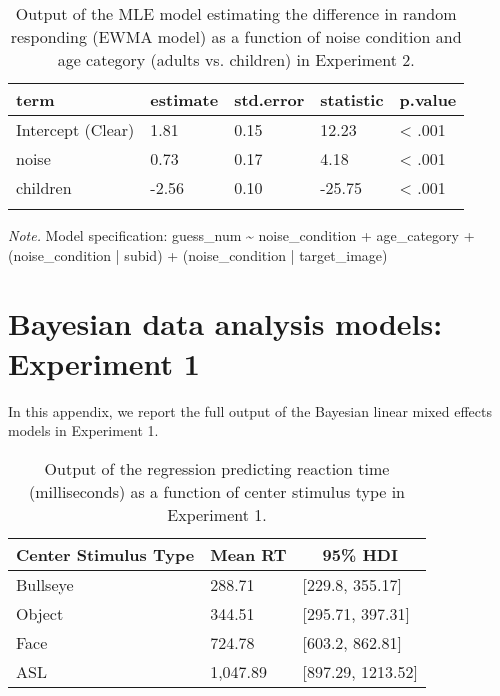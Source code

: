 \documentclass[,man,floatsintext]{apa6}
\begin{document}
\begin{appendix}
\begin{table}[h]
\begin{center}
\begin{threeparttable}
\caption{\label{tab:mle ewma noise}Output of the MLE model estimating the difference in random responding (EWMA model) as a function of noise condition and age category (adults vs. children) in Experiment 2.}
\begin{tabular}{lllll}
\toprule
term & \multicolumn{1}{c}{estimate} & \multicolumn{1}{c}{std.error} & \multicolumn{1}{c}{statistic} & \multicolumn{1}{c}{p.value}\\
\midrule
Intercept (Clear) & 1.81 & 0.15 & 12.23 & < .001\\
noise & 0.73 & 0.17 & 4.18 & < .001\\
children & -2.56 & 0.10 & -25.75 & < .001\\
\bottomrule
\addlinespace
\end{tabular}
\begin{tablenotes}[para]
\normalsize{\textit{Note.} Model specification: guess\_num \textasciitilde{} noise\_condition + age\_category + (noise\_condition | subid) + (noise\_condition | target\_image)}
\end{tablenotes}
\end{threeparttable}
\end{center}
\end{table}

\hypertarget{bayesian-data-analysis-models-experiment-1}{%
\section{Bayesian data analysis models: Experiment
1}\label{bayesian-data-analysis-models-experiment-1}}

In this appendix, we report the full output of the Bayesian linear mixed
effects models in Experiment 1.

\begin{table}[h]
\begin{center}
\begin{threeparttable}
\caption{\label{tab:trio-rt-model}Output of the regression predicting reaction time (milliseconds) as a function of center stimulus type in Experiment 1.}
\begin{tabular}{lll}
\toprule
Center Stimulus Type & \multicolumn{1}{c}{Mean RT} & \multicolumn{1}{c}{95\% HDI}\\
\midrule
Bullseye & 288.71 & [229.8, 355.17]\\
Object & 344.51 & [295.71, 397.31]\\
Face & 724.78 & [603.2, 862.81]\\
ASL & 1,047.89 & [897.29, 1213.52]\\
\bottomrule
\end{tabular}
\end{threeparttable}
\end{center}
\end{table}


\end{appendix}
\end{document}
